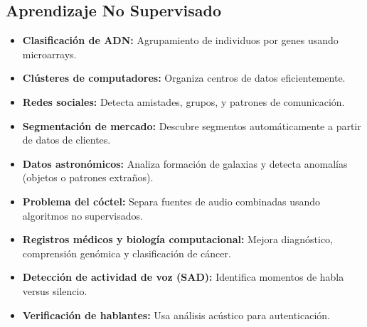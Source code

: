\documentclass[12pt]{article}
\begin{document}
\subsection{Aprendizaje No Supervisado}
\begin{itemize}
  \item \textbf{Clasificaci\'on de ADN:} Agrupamiento de individuos por genes usando microarrays.
  \item \textbf{Cl\'usteres de computadores:} Organiza centros de datos eficientemente.
  \item \textbf{Redes sociales:} Detecta amistades, grupos, y patrones de comunicaci\'on.
  \item \textbf{Segmentaci\'on de mercado:} Descubre segmentos autom\'aticamente a partir de datos de clientes.
  \item \textbf{Datos astron\'omicos:} Analiza formaci\'on de galaxias y detecta anomal\'ias (objetos o patrones extra\~nos).
  \item \textbf{Problema del c\'octel:} Separa fuentes de audio combinadas usando algoritmos no supervisados.
  \item \textbf{Registros m\'edicos y biolog\'ia computacional:} Mejora diagn\'ostico, comprensi\'on gen\'omica y clasificaci\'on de c\'ancer.
  \item \textbf{Detecci\'on de actividad de voz (SAD):} Identifica momentos de habla versus silencio.
  \item \textbf{Verificaci\'on de hablantes:} Usa an\'alisis ac\'ustico para autenticaci\'on.
\end{itemize}
\end{document}
